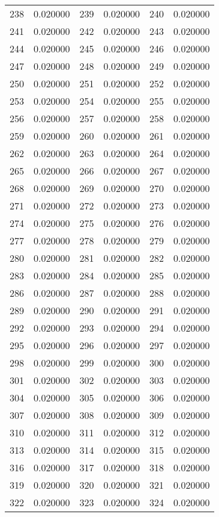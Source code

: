 \documentclass[12pt]{article}
\begin{document}
\begin{longtable}{@{}cc|cc|cc@{}}
238 & 0.020000 & 239 & 0.020000 & 240 & 0.020000 \\
241 & 0.020000 & 242 & 0.020000 & 243 & 0.020000 \\
244 & 0.020000 & 245 & 0.020000 & 246 & 0.020000 \\
247 & 0.020000 & 248 & 0.020000 & 249 & 0.020000 \\
250 & 0.020000 & 251 & 0.020000 & 252 & 0.020000 \\
253 & 0.020000 & 254 & 0.020000 & 255 & 0.020000 \\
256 & 0.020000 & 257 & 0.020000 & 258 & 0.020000 \\
259 & 0.020000 & 260 & 0.020000 & 261 & 0.020000 \\
262 & 0.020000 & 263 & 0.020000 & 264 & 0.020000 \\
265 & 0.020000 & 266 & 0.020000 & 267 & 0.020000 \\
268 & 0.020000 & 269 & 0.020000 & 270 & 0.020000 \\
271 & 0.020000 & 272 & 0.020000 & 273 & 0.020000 \\
274 & 0.020000 & 275 & 0.020000 & 276 & 0.020000 \\
277 & 0.020000 & 278 & 0.020000 & 279 & 0.020000 \\
280 & 0.020000 & 281 & 0.020000 & 282 & 0.020000 \\
283 & 0.020000 & 284 & 0.020000 & 285 & 0.020000 \\
286 & 0.020000 & 287 & 0.020000 & 288 & 0.020000 \\
289 & 0.020000 & 290 & 0.020000 & 291 & 0.020000 \\
292 & 0.020000 & 293 & 0.020000 & 294 & 0.020000 \\
295 & 0.020000 & 296 & 0.020000 & 297 & 0.020000 \\
298 & 0.020000 & 299 & 0.020000 & 300 & 0.020000 \\
301 & 0.020000 & 302 & 0.020000 & 303 & 0.020000 \\
304 & 0.020000 & 305 & 0.020000 & 306 & 0.020000 \\
307 & 0.020000 & 308 & 0.020000 & 309 & 0.020000 \\
310 & 0.020000 & 311 & 0.020000 & 312 & 0.020000 \\
313 & 0.020000 & 314 & 0.020000 & 315 & 0.020000 \\
316 & 0.020000 & 317 & 0.020000 & 318 & 0.020000 \\
319 & 0.020000 & 320 & 0.020000 & 321 & 0.020000 \\
322 & 0.020000 & 323 & 0.020000 & 324 & 0.020000 \\

\end{longtable}
\end{document}
